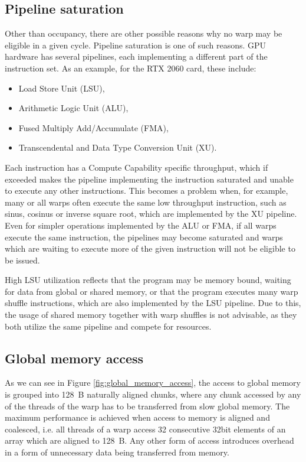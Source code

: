 \subsection{Pipeline saturation}

Other than occupancy, there are other possible reasons why no warp may be eligible in a given cycle. Pipeline saturation is one of such reasons. GPU hardware has several pipelines, each implementing a different part of the instruction set. As an example, for the RTX 2060 card, these include:
\begin{itemize}
	\item Load Store Unit (LSU),
	\item Arithmetic Logic Unit (ALU),
	\item Fused Multiply Add/Accumulate (FMA),
	\item Transcendental and Data Type Conversion Unit (XU).
\end{itemize}

Each instruction has a Compute Capability specific throughput, which if exceeded makes the pipeline implementing the instruction saturated and unable to execute any other instructions. This becomes a problem when, for example, many or all warps often execute the same low throughput instruction, such as sinus, cosinus or inverse square root, which are implemented by the XU pipeline. Even for simpler operations implemented by the ALU or FMA, if all warps execute the same instruction, the pipelines may become saturated and warps which are waiting to execute more of the given instruction will not be eligible to be issued.

High LSU utilization reflects that the program may be memory bound, waiting for data from global or shared memory, or that the program executes many warp shuffle instructions, which are also implemented by the LSU pipeline. Due to this, the usage of shared memory together with warp shuffles is not advisable, as they both utilize the same pipeline and compete for resources.


\subsection{Global memory access}

As we can see in Figure \ref{fig:global_memory_access}, the access to global memory is grouped into 128~B naturally aligned chunks, where any chunk accessed by any of the threads of the warp has to be transferred from slow global memory. The maximum performance is achieved when access to memory is aligned and coalesced, i.e. all threads of a warp access 32 consecutive 32bit elements of an array which are aligned to 128~B. Any other form of access introduces overhead in a form of unnecessary data being transferred from memory. 

